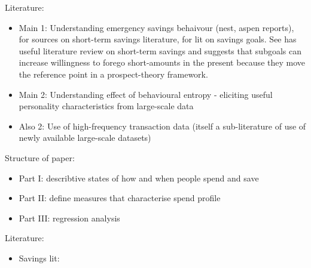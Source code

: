 Literature:
\begin{itemize}

    \item Main 1: Understanding emergency savings behaivour (nest, aspen
        reports), \citep{sabat2019rules} for sources on short-term savings
        literature, \citet{colby2013savings} for lit on savings goals.  See
        \citet{colby2013savings} has useful literature review on short-term
        savings and suggests that subgoals can increase willingness to forego
        short-amounts in the present because they move the reference point in a
        prospect-theory framework.


    \item Main 2: Understanding effect of behavioural entropy - eliciting
        useful personality characteristics from large-scale data

    \item Also 2: Use of high-frequency transaction data (itself a
        sub-literature of use of newly available large-scale datasets)

\end{itemize}


Structure of paper:


\begin{itemize}

    \item Part I: describtive states of how and when people spend and save

    \item Part II: define measures that characterise spend profile

    \item Part III: regression analysis

\end{itemize}


Literature:
\begin{itemize}
    \item Savings lit: \citet{lunt1991psychological, oaten2007improvements, }
\end{itemize}





